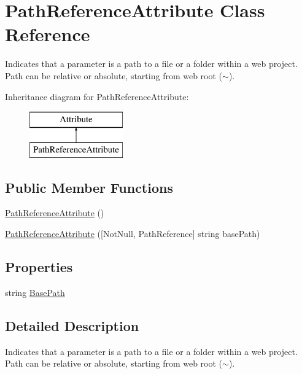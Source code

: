 \hypertarget{class_path_reference_attribute}{}\section{Path\+Reference\+Attribute Class Reference}
\label{class_path_reference_attribute}


Indicates that a parameter is a path to a file or a folder within a web project. Path can be relative or absolute, starting from web root ($\sim$).  


Inheritance diagram for Path\+Reference\+Attribute\+:\begin{figure}[H]
\begin{center}
\leavevmode
\includegraphics[height=2.000000cm]{class_path_reference_attribute}
\end{center}
\end{figure}
\subsection*{Public Member Functions}
\begin{DoxyCompactItemize}
\item 
\mbox{\hyperlink{class_path_reference_attribute_acc0edf7e4dd23ad0340083ddfdaa4cba}{Path\+Reference\+Attribute}} ()
\item 
\mbox{\hyperlink{class_path_reference_attribute_a29ad342f2276a6192d03692e85f2f5e3}{Path\+Reference\+Attribute}} (\mbox{[}Not\+Null, Path\+Reference\mbox{]} string base\+Path)
\end{DoxyCompactItemize}
\subsection*{Properties}
\begin{DoxyCompactItemize}
\item 
string \mbox{\hyperlink{class_path_reference_attribute_ae6cf5aa92a7198b24c0656f974c3738d}{Base\+Path}}
\end{DoxyCompactItemize}


\subsection{Detailed Description}
Indicates that a parameter is a path to a file or a folder within a web project. Path can be relative or absolute, starting from web root ($\sim$). 



